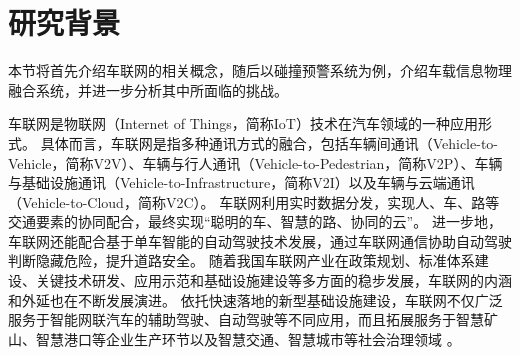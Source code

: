 \section{研究背景}\label{section 1-2}

本节将首先介绍车联网的相关概念，随后以碰撞预警系统为例，介绍车载信息物理融合系统，并进一步分析其中所面临的挑战。

车联网是物联网（Internet of Things，简称IoT）技术在汽车领域的一种应用形式。
具体而言，车联网是指多种通讯方式的融合，包括车辆间通讯（Vehicle-to-Vehicle，简称V2V）、车辆与行人通讯（Vehicle-to-Pedestrian，简称V2P）、车辆与基础设施通讯（Vehicle-to-Infrastructure，简称V2I）以及车辆与云端通讯（Vehicle-to-Cloud，简称V2C）。
车联网利用实时数据分发，实现人、车、路等交通要素的协同配合，最终实现“聪明的车、智慧的路、协同的云”。
进一步地，车联网还能配合基于单车智能的自动驾驶技术发展，通过车联网通信协助自动驾驶判断隐藏危险，提升道路安全。
随着我国车联网产业在政策规划、标准体系建设、关键技术研发、应用示范和基础设施建设等多方面的稳步发展，车联网的内涵和外延也在不断发展演进。
依托快速落地的新型基础设施建设，车联网不仅广泛服务于智能网联汽车的辅助驾驶、自动驾驶等不同应用，而且拓展服务于智慧矿山、智慧港口等企业生产环节以及智慧交通、智慧城市等社会治理领域 \cite{zhong2021che}。

